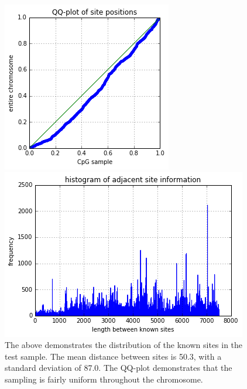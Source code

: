 \documentclass{article} %
\begin{document}
\begin{figure}[H]
    \centering
    
    \begin{minipage}[b]{0.3\textwidth}
        \includegraphics[width=\textwidth]{qqtest.png}
    \end{minipage}
    \hspace{0.15\textwidth}
    \begin{minipage}[b]{0.4\textwidth}
        \includegraphics[width=\textwidth]{adjhist.png}
    \end{minipage}
    
    \caption{The above demonstrates the distribution of the known sites in the test sample. The mean distance between sites is 50.3, with a standard deviation of 87.0. The QQ-plot demonstrates that the sampling is fairly uniform throughout the chromosome.}
    \label{fig:sampleknowndistrib}
\end{figure}
\end{document}
